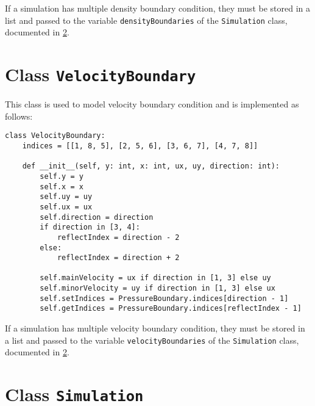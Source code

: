 If a simulation has multiple density boundary condition, they must be stored in a list and passed to the variable \texttt{densityBoundaries} of the \texttt{Simulation} class, documented in \cref{sec:class-simulation}.

\section[Class: velocity boundary condition]{Class \texttt{VelocityBoundary}}

This class is used to model velocity boundary condition and is implemented as follows:
\begin{verbatim}
class VelocityBoundary:
    indices = [[1, 8, 5], [2, 5, 6], [3, 6, 7], [4, 7, 8]]

    def __init__(self, y: int, x: int, ux, uy, direction: int):
        self.y = y
        self.x = x
        self.uy = uy
        self.ux = ux
        self.direction = direction
        if direction in [3, 4]:
            reflectIndex = direction - 2
        else:
            reflectIndex = direction + 2

        self.mainVelocity = ux if direction in [1, 3] else uy
        self.minorVelocity = uy if direction in [1, 3] else ux
        self.setIndices = PressureBoundary.indices[direction - 1]
        self.getIndices = PressureBoundary.indices[reflectIndex - 1]
\end{verbatim}
If a simulation has multiple velocity boundary condition, they must be stored in a list and passed to the variable \texttt{velocityBoundaries} of the \texttt{Simulation} class, documented in \cref{sec:class-simulation}.

\section[Class: simulation]{Class \texttt{Simulation}}
\label{sec:class-simulation}

